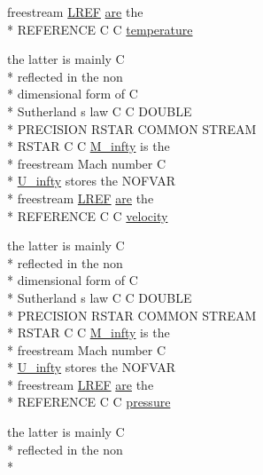 \begin{DoxyCompactItemize}
freestream \hyperlink{stream_8com_a19d492a15feda819ed49e580c6a1568f}{L\-R\-E\-F} \hyperlink{ibc8_8com_a7f7721a0bb3c1d35cfbfbcfd6efc1548}{are} the \\*
R\-E\-F\-E\-R\-E\-N\-C\-E C C \hyperlink{stream_8com_a46fb926ed83966d981ba4bbfd791eaed}{temperature}
\item 
the latter is mainly C \\*
reflected in the non \\*
dimensional form of C \\*
Sutherland s law C C D\-O\-U\-B\-L\-E \\*
P\-R\-E\-C\-I\-S\-I\-O\-N R\-S\-T\-A\-R C\-O\-M\-M\-O\-N S\-T\-R\-E\-A\-M \\*
R\-S\-T\-A\-R C C \hyperlink{stream_8com_a57c765efd76d44669f6966962bda2d72}{M\-\_\-infty} is the \\*
freestream Mach number C \\*
\hyperlink{stream_8com_a3306f725a42d6173548f0867aa4313ef}{U\-\_\-infty} stores the N\-O\-F\-V\-A\-R \\*
freestream \hyperlink{stream_8com_a19d492a15feda819ed49e580c6a1568f}{L\-R\-E\-F} \hyperlink{ibc8_8com_a7f7721a0bb3c1d35cfbfbcfd6efc1548}{are} the \\*
R\-E\-F\-E\-R\-E\-N\-C\-E C C \hyperlink{stream_8com_a4acbada976d4b32776408b1d1e55321a}{velocity}
\item 
the latter is mainly C \\*
reflected in the non \\*
dimensional form of C \\*
Sutherland s law C C D\-O\-U\-B\-L\-E \\*
P\-R\-E\-C\-I\-S\-I\-O\-N R\-S\-T\-A\-R C\-O\-M\-M\-O\-N S\-T\-R\-E\-A\-M \\*
R\-S\-T\-A\-R C C \hyperlink{stream_8com_a57c765efd76d44669f6966962bda2d72}{M\-\_\-infty} is the \\*
freestream Mach number C \\*
\hyperlink{stream_8com_a3306f725a42d6173548f0867aa4313ef}{U\-\_\-infty} stores the N\-O\-F\-V\-A\-R \\*
freestream \hyperlink{stream_8com_a19d492a15feda819ed49e580c6a1568f}{L\-R\-E\-F} \hyperlink{ibc8_8com_a7f7721a0bb3c1d35cfbfbcfd6efc1548}{are} the \\*
R\-E\-F\-E\-R\-E\-N\-C\-E C C \hyperlink{stream_8com_a0facbcffae9f2ce2b94119850b5fc3d3}{pressure}
\item 
the latter is mainly C \\*
reflected in the non \\*

\end{DoxyCompactItemize}
